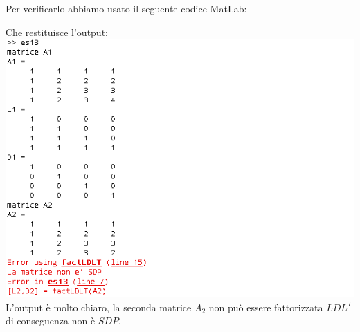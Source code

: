 \label{es313}
\begin{flushleft}
Per verificarlo abbiamo usato il seguente codice MatLab:

Che restituisce l'output:
\includegraphics[width=\textwidth]{cap_3/es13/es313.png}
L'output è molto chiaro, la seconda matrice $A_{2}$ non può essere fattorizzata $LDL^T$ di conseguenza non è $SDP$.
\end{flushleft}

